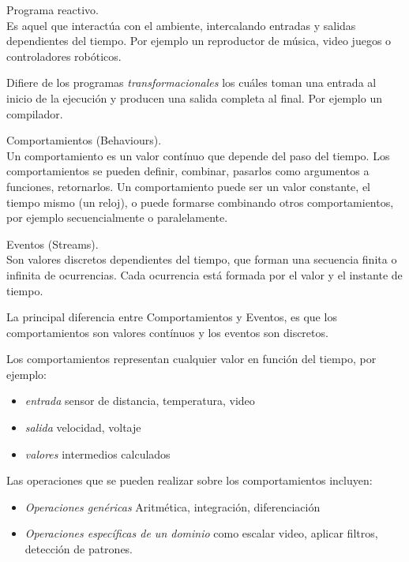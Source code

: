 \begin{definicion}
Programa reactivo.\\
Es aquel que interactúa con el ambiente, intercalando entradas
y salidas dependientes del tiempo. Por ejemplo un reproductor
de música, video juegos o controladores robóticos.

Difiere de los programas \emph{transformacionales} los cuáles
toman una entrada al inicio de la ejecución y producen una salida
completa al final. Por ejemplo un compilador.

\begin{definicion}
Comportamientos (Behaviours).\\
Un comportamiento es un valor contínuo que depende del paso del tiempo.
Los comportamientos se pueden definir, combinar, pasarlos como
argumentos a funciones, retornarlos.
Un comportamiento puede ser un valor constante, el tiempo mismo (un reloj),
o puede formarse combinando otros comportamientos, por ejemplo secuencialmente
o paralelamente.
\end{definicion}

\begin{definicion}
Eventos (Streams).\\
Son valores discretos dependientes del tiempo, que forman
una secuencia finita o infinita de ocurrencias. Cada ocurrencia
está formada por el valor y el instante de tiempo.
\end{definicion}

La principal diferencia entre Comportamientos y Eventos, es que los
comportamientos son valores contínuos y los eventos son discretos.

Los comportamientos representan cualquier valor en función del tiempo,
por ejemplo:
\begin{itemize}
\item \textit{entrada} sensor de distancia, temperatura, video
\item \textit{salida} velocidad, voltaje
\item \textit{valores} intermedios calculados
\end{itemize}

Las operaciones que se pueden realizar sobre los comportamientos incluyen:
\begin{itemize}
\item \textit{Operaciones genéricas} Aritmética, integración, diferenciación
\item \textit{Operaciones específicas de un dominio} como escalar video, aplicar filtros, detección de patrones.
\end{itemize}


\end{definicion}
